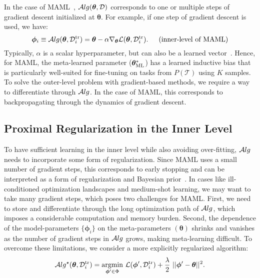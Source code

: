 \documentclass{article} \usepackage[nonatbib, final]{mod_neurips}
\newcommand{\task}{\mathcal{T}}
\newcommand{\loss}{\mathcal{L}}
\newcommand{\data}{\mathcal{D}}
\DeclareMathOperator*{\argmin}{\mathrm{argmin}}
\newcommand{\param}{{\bm{\phi}}}               \newcommand{\paramspace}{\Phi}
\newcommand{\prior}{{\bm{\theta}}}               \newcommand{\priorspace}{\Theta}
\newcommand{\algstar}{\mathcal{A}lg^\star}
\newcommand{\datatr}{\data^{\mathrm{tr}}}
\begin{document}
In the case of MAML~\cite{maml}, $\alg(\prior, \data)$ corresponds to
one or multiple steps of gradient descent initialized at $\prior$. For
example, if one step of gradient descent is used, we have:
\begin{equation}
    \label{eq:maml_gd}
  \param_i \equiv \alg(\prior, \datatr_i) = \prior - \alpha \nabla_\prior \loss(\prior,
\datatr_i).  \hspace*{15pt} \text{(inner-level of MAML)}
\end{equation}
Typically, $\alpha$ is a scalar hyperparameter, but can also be a learned vector~\cite{metasgd}. Hence, for MAML, the meta-learned parameter ($\mlprior$) has a learned inductive bias that is particularly well-suited for fine-tuning on tasks from $P(\task)$ using $K$ samples.
To solve the outer-level problem with gradient-based methods, we require a way to differentiate through $\mathcal{A}lg$. In the case of MAML, this corresponds to backpropagating through the dynamics of gradient descent.


\vspace*{-0.1cm}
\subsection{Proximal Regularization in the Inner Level}
\vspace*{-0.1cm}
\label{sec:proximal_regularization}
To have sufficient learning in the inner level while also avoiding over-fitting, $\mathcal{A}lg$ needs to incorporate some form of regularization. Since MAML uses a small number of gradient steps, this corresponds to early stopping and can be interpreted as a form of regularization and Bayesian prior~\cite{erin}. In cases like ill-conditioned optimization landscapes and medium-shot learning, we may want to take many gradient steps, which poses two challenges for MAML. First, we need to store and differentiate through the long optimization path of $\mathcal{A}lg$, which imposes a considerable computation and memory burden. Second, the dependence of the model-parameters $\{ \param_i \}$ on the meta-parameters $(\prior)$ shrinks and vanishes as the number of gradient steps in $\mathcal{A}lg$ grows, making meta-learning difficult.
To overcome these limitations, we consider a more explicitly regularized algorithm: 
\begin{equation}
    \label{eq:update_rule_supervised}
    \algstar(\prior, \datatr_i) = \underset{\dparam \in \paramspace}{\argmin}~\loss(\dparam, \datatr_i) + \frac{\lambda}{2}~||\dparam - \prior||^2.
  \end{equation}
\vspace*{-0.1cm}
\end{document}
